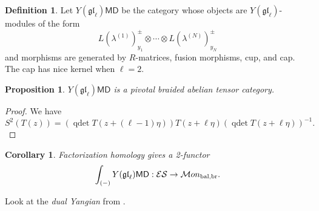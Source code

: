 \documentclass[11pt]{report}
\newtheorem{prop}[theorem]{Proposition}
\newtheorem{corollary}[theorem]{Corollary}
\theoremstyle{definition}
\newtheorem{definition}[theorem]{Definition}
\theoremstyle{remark}
\theoremstyle{remark}
\begin{document}
\begin{definition}
Let $Y(\mathfrak{gl}_\ell)\mathsf{MD}$ be the category whose objects are $Y(\mathfrak{gl}_\ell)$-modules of the form
\begin{equation*}
L(\lambda^{(1)})_{y_1}^\pm \otimes \cdots \otimes L(\lambda^{(N)})_{y_N}^\pm
\end{equation*}
and morphisms are generated by $R$-matrices, fusion morphisms, cup, and cap. The cap has nice kernel when $\ell=2$.
\end{definition}

\begin{prop}
$Y(\mathfrak{gl}_\ell)\mathsf{MD}$ is a pivotal braided abelian tensor category.
\end{prop}

\begin{proof}
We have
\begin{equation*}
S^2(T(z)) = (\operatorname{qdet} T(z + (\ell-1) \eta)) T(z+\ell \eta) (\operatorname{qdet} T(z + \ell \eta))^{-1}.
\end{equation*}
\end{proof}

\begin{corollary}
Factorization homology gives a 2-functor
\begin{equation*}
\int_{(-)} Y(\mathfrak{gl}_\ell)\mathsf{MD}: \mathcal{ES} \to \mathcal{M}on_\textnormal{bal,br}.
\end{equation*}
\end{corollary}

Look at the \emph{dual Yangian} from \cite{article:wendlandt:2022}.

\pagebreak
\end{document}
